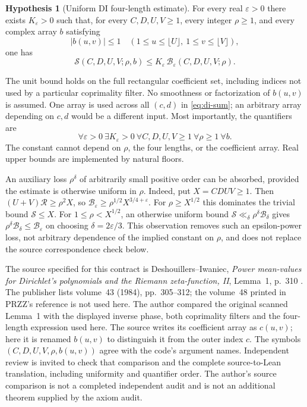 \documentclass[11pt]{article}
\theoremstyle{definition}
\newtheorem{hypothesis}{Hypothesis}
\begin{document}
\begin{hypothesis}[Uniform DI four-length estimate]\label{hyp:di}
For every real $\varepsilon>0$ there exists $K_\varepsilon>0$ such that,
for every $C,D,U,V\ge1$, every integer $\rho\ge1$, and every complex
array $b$ satisfying
\[
 |b(u,v)|\le1\quad
 (1\le u\le\lfloor U\rfloor,\ 1\le v\le\lfloor V\rfloor),
\]
one has
\begin{equation}\label{eq:di}
 \mathscr S(C,D,U,V;\rho,b)
       \le K_\varepsilon\,\mathscr B_\varepsilon(C,D,U,V;\rho).
\end{equation}
\end{hypothesis}

The unit bound holds on the full rectangular coefficient set, including
indices not used by a particular coprimality filter. No smoothness or
factorization of $b(u,v)$ is assumed. One array is used across all
$(c,d)$ in \eqref{eq:di-sum}; an arbitrary array depending on $c,d$ would
be a different input. Most importantly, the quantifiers are
\[
 \forall\varepsilon>0\ \exists K_\varepsilon>0\
 \forall C,D,U,V\ge1\ \forall\rho\ge1\ \forall b.
\]
The constant cannot depend on $\rho$, the four lengths, or the
coefficient array. Real upper bounds are implemented by natural floors.

An auxiliary loss $\rho^\delta$ of arbitrarily small positive order can
be absorbed, provided the estimate is otherwise uniform in $\rho$.
Indeed, put $X=CDUV\ge1$. Then
$(U+V)\mathscr R\ge\rho^2X$, so
$\mathscr B_\varepsilon\ge\rho^{1/2}X^{3/4+\varepsilon}$.
For $\rho\ge X^{1/2}$ this dominates the trivial bound
$\mathscr S\le X$. For $1\le\rho<X^{1/2}$, an otherwise uniform bound
$\mathscr S\ll_\delta\rho^\delta\mathscr B_\delta$ gives
$\rho^\delta\mathscr B_\delta\le\mathscr B_\varepsilon$ on choosing
$\delta=2\varepsilon/3$.
This observation removes such an epsilon-power loss, not arbitrary
dependence of the implied constant on $\rho$, and does not replace the
source correspondence check below.

The source specified for this contract is Deshouillers--Iwaniec,
\emph{Power mean-values for Dirichlet's polynomials and the Riemann
zeta-function, II}, Lemma~1, p.~310 \cite{DI}.
The publisher lists volume~43 (1984), pp.~305--312; the volume~48 printed
in PRZZ's reference is not used here. The author compared the original
scanned Lemma~1 with the displayed inverse phase, both coprimality filters
and the four-length expression used here.
The source writes its coefficient array as \(c(u,v)\); here it is
renamed \(b(u,v)\) to distinguish it from the outer index \(c\).
The symbols
$(C,D,U,V,\rho,b(u,v))$ agree with the code's argument names.
Independent review is invited to check that comparison and the complete
source-to-Lean translation, including uniformity and quantifier order.
The author's source comparison is not a completed independent audit
and is not an additional theorem supplied by the axiom audit.
\end{document}
